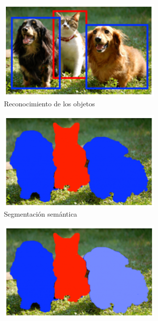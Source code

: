 \documentclass[conference,compsoc]{IEEEtran}
\begin{document}
\begin{figure}[H]
\centering
\begin{subfigure}{.3\linewidth}
\centering
\includegraphics[width = \linewidth]{reconocimiento}
\caption{Reconocimiento de los objetos}
\end{subfigure}%
\hspace{1em}%
\begin{subfigure}{.3\linewidth}
\centering
\includegraphics[width = \linewidth]{setmentacionsemantica}
\caption{Segmentación semántica}
\end{subfigure}%
\hspace{2em}%
\begin{subfigure}{.3\linewidth}
\centering
\includegraphics[width = \linewidth]{segmetaciondeinstancias}

\end{subfigure}
\end{figure}
\end{document}
